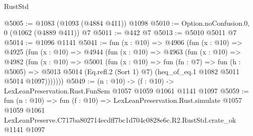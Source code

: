 \begin{lexlean}{RustStd}
\begin{coremodule}
@5005 := @1083 (@1093 (@4884 @411)) @1098
@5010 := Option.noConfusion.{0, 0} (@1062 (@4889 @411)) @7
@5011 := @442 @7
@5013 := @5010 @5011 @7
@5014 := @1096 @1141
@5041 := fun (x : @10) =>
  @4906
    (fun (x : @10) =>
    @4925
      (fun (x : @10) =>
      @4944
        (fun (x : @10) =>
        @4963
          (fun (x : @10) =>
          @4982
            (fun (x : @10) =>
            @5001
              (fun (x : @10) =>
              fun (fn : @7) =>
              fun (h : @5005) =>
              @5013 @5014 (Eq.refl.{2} (Sort 1) @7) (heq_of_eq.{1} @1082 @5011 @5014 @1097)))))))
@5049 := (n : @10) -> (f : @10) -> LexLeanPreservation.Rust.FunSem @1057 @1059 @1061 @1141 @1097
@5059 := fun (n : @10) =>
  fun (f : @10) =>
  LexLeanPreservation.Rust.simulate
    @1057
    @1059
    @1061
    LexLeanPreserve.C717ba802714ecdff7bc1d704c0828e6c.R2.RustStd.crate_ok
    @1141
    @1097
\end{coremodule}
\end{lexlean}
